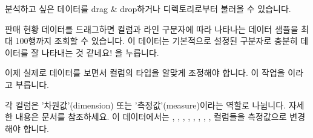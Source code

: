 \documentclass[letterpaper,10pt,english]{sphinxmanual}
\begin{document}
분석하고 싶은 데이터를 drag \& drop하거나 디렉토리로부터 불러올 수 있습니다.
\begin{quote}

\begin{figure}[H]
\centering

\noindent{}
\end{figure}
\end{quote}

판매 현황 데이터를 드래그하면 컬럼과 라인 구분자에 따라 나타나는 데이터 샘플을 최대 100행까지 조회할 수 있습니다. 이 데이터는 기본적으로 설정된 구분자로 충분히 데이터를 잘 나타내는 것 같네요! 을 누릅니다.
\begin{quote}

\begin{figure}[H]
\centering

\noindent{}
\end{figure}
\end{quote}

이제 실제로 데이터를 보면서 컬럼의 타입을 알맞게 조정해야 합니다. 이 작업을 이라고 부릅니다.
\begin{quote}

\begin{figure}[H]
\centering

\noindent{}
\end{figure}
\end{quote}

각 컬럼은 '차원값'(dimension) 또는 '측정값'(measure)이라는 역할로 나뉩니다. 자세한 내용은 {\hyperref[\detokenize{discovery/part02/dimension_and_measures::doc}]{}} 문서를 참조하세요. 이 데이터에서는 , , , , , , , ,  컬럼들을 측정값으로 변경해야 합니다.
\end{document}
